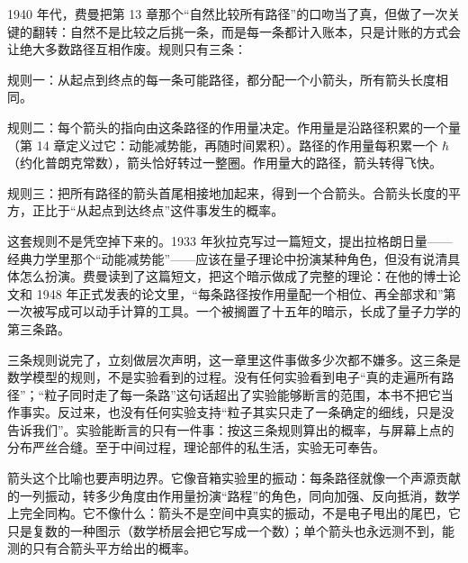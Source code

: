 
1940 年代，费曼把第 13 章那个“自然比较所有路径”的口吻当了真，但做了一次关键的翻转：自然不是比较之后挑一条，而是每一条都计入账本，只是计账的方式会让绝大多数路径互相作废。规则只有三条：

规则一：从起点到终点的每一条可能路径，都分配一个小箭头，所有箭头长度相同。

规则二：每个箭头的指向由这条路径的作用量决定。作用量是沿路径积累的一个量（第 14 章定义过它：动能减势能，再随时间累积）。路径的作用量每积累一个 \(\hbar\)（约化普朗克常数），箭头恰好转过一整圈。作用量大的路径，箭头转得飞快。

规则三：把所有路径的箭头首尾相接地加起来，得到一个合箭头。合箭头长度的平方，正比于“从起点到达终点”这件事发生的概率。

这套规则不是凭空掉下来的。1933 年狄拉克写过一篇短文，提出拉格朗日量——经典力学里那个“动能减势能”——应该在量子理论中扮演某种角色，但没有说清具体怎么扮演。费曼读到了这篇短文，把这个暗示做成了完整的理论：在他的博士论文和 1948 年正式发表的论文里，“每条路径按作用量配一个相位、再全部求和”第一次被写成可以动手计算的工具。一个被搁置了十五年的暗示，长成了量子力学的第三条路。

\begin{center}
\end{center}

三条规则说完了，立刻做层次声明，这一章里这件事做多少次都不嫌多。这三条是数学模型的规则，不是实验看到的过程。没有任何实验看到电子“真的走遍所有路径”；“粒子同时走了每一条路”这句话超出了实验能够断言的范围，本书不把它当作事实。反过来，也没有任何实验支持“粒子其实只走了一条确定的细线，只是没告诉我们”。实验能断言的只有一件事：按这三条规则算出的概率，与屏幕上点的分布严丝合缝。至于中间过程，理论部件的私生活，实验无可奉告。

箭头这个比喻也要声明边界。它像音箱实验里的振动：每条路径就像一个声源贡献的一列振动，转多少角度由作用量扮演“路程”的角色，同向加强、反向抵消，数学上完全同构。它不像什么：箭头不是空间中真实的振动，不是电子甩出的尾巴，它只是复数的一种图示（数学桥层会把它写成一个数）；单个箭头也永远测不到，能测的只有合箭头平方给出的概率。


